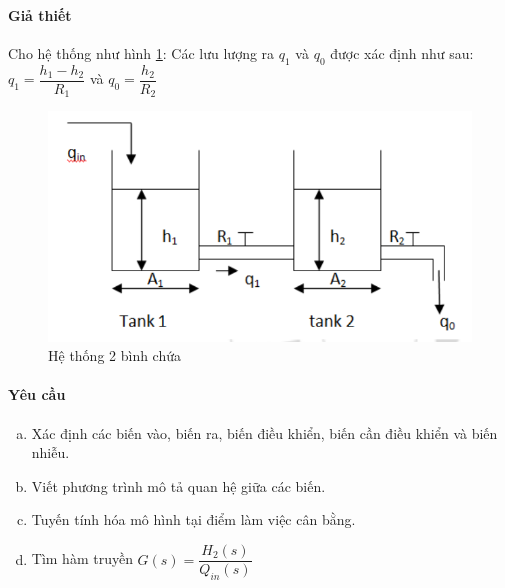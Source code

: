 \documentclass[12pt,a4paper]{article}
\begin{document}
    \paragraph{Giả thiết}
    Cho hệ thống như hình \ref{baitap2}:  Các lưu lượng ra $q_1$ và $q_0$ được xác định như sau: $q_1 = \dfrac{h_1 - h_2}{R_1}$ và $q_0 = \dfrac{h_2}{R_2}$
    \begin{figure}[htp]
        \begin{center}
            \includegraphics[scale=.5]{bai2}
        \end{center}
        \caption{Hệ thống 2 bình chứa} \label{baitap2}
    \end{figure}

    \paragraph{Yêu cầu}
        \begin{enumerate}[a.]
            \item Xác định các biến vào, biến ra, biến điều khiển, biến cần điều khiển và biến nhiễu.
            \item Viết phương trình mô tả quan hệ giữa các biến.
            \item Tuyến tính hóa mô hình tại điểm làm việc cân bằng.
            \item Tìm hàm truyền $G(s) = \dfrac{H_2(s)}{Q_{in}(s)}$
        \end{enumerate}
\end{document}
